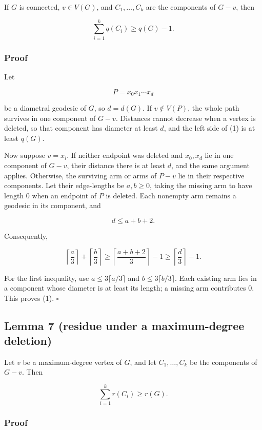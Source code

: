 \documentclass[
  11pt,
  letterpaper,
]{article}
\newcounter{none} %
\begin{document}
If \(G\) is connected, \(v\in V(G)\), and \(C_1,\ldots,C_k\) are the
components of \(G-v\), then

\[
\sum_{i=1}^k q(C_i)\ge q(G)-1.
\tag{1}
\]

\subsubsection{Proof}\label{proof-5}

Let

\[
P=x_0x_1\cdots x_d
\]

be a diametral geodesic of \(G\), so \(d=d(G)\). If \(v\notin V(P)\),
the whole path survives in one component of \(G-v\). Distances cannot
decrease when a vertex is deleted, so that component has diameter at
least \(d\), and the left side of (1) is at least \(q(G)\).

Now suppose \(v=x_i\). If neither endpoint was deleted and \(x_0,x_d\)
lie in one component of \(G-v\), their distance there is at least \(d\),
and the same argument applies. Otherwise, the surviving arm or arms of
\(P-v\) lie in their respective components. Let their edge-lengths be
\(a,b\ge0\), taking the missing arm to have length \(0\) when an
endpoint of \(P\) is deleted. Each nonempty arm remains a geodesic in
its component, and

\[
d\le a+b+2.
\]

Consequently,

\[
\left\lceil\frac a3\right\rceil+
\left\lceil\frac b3\right\rceil
\ge
\left\lceil\frac{a+b+2}{3}\right\rceil-1
\ge
\left\lceil\frac d3\right\rceil-1.
\]

For the first inequality, use \(a\le3\lceil a/3\rceil\) and
\(b\le3\lceil b/3\rceil\). Each existing arm lies in a component whose
diameter is at least its length; a missing arm contributes \(0\). This
proves (1). \(\square\)

\subsection{Lemma 7 (residue under a maximum-degree
deletion)}\label{lemma-7-residue-under-a-maximum-degree-deletion}

Let \(v\) be a maximum-degree vertex of \(G\), and let
\(C_1,\ldots,C_k\) be the components of \(G-v\). Then

\[
\sum_{i=1}^k r(C_i)\ge r(G).
\tag{2}
\]

\subsubsection{Proof}\label{proof-6}
\end{document}
